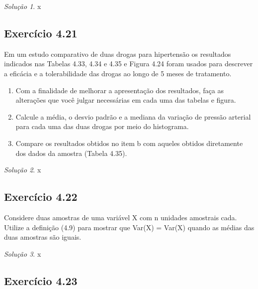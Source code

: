 \documentclass[
]{latex/krantz}
\providecommand{\tightlist}{%
  \setlength{\itemsep}{0pt}\setlength{\parskip}{0pt}}
\theoremstyle{definition}
\theoremstyle{definition}
\theoremstyle{definition}
\theoremstyle{definition}
\theoremstyle{remark}
\newtheorem*{solution}{Solução}
\begin{document}
\begin{solution}
x
\end{solution}

\hypertarget{exr4-21}{%
\subsection*{Exercício 4.21}\label{exr4-21}}

Em um estudo comparativo de duas drogas para hipertensão os resultados indicados nas Tabelas 4.33, 4.34 e 4.35 e Figura 4.24 foram usados para descrever a eficácia e a tolerabilidade das drogas ao longo de 5 meses de tratamento.

\begin{enumerate}
\def\labelenumi{\alph{enumi}.}
\tightlist
\item
  Com a finalidade de melhorar a apresentação dos resultados, faça as alterações que você julgar necessárias em cada uma das tabelas e figura.
\item
  Calcule a média, o desvio padrão e a mediana da variação de pressão arterial para cada uma das duas drogas por meio do histograma.
\item
  Compare os resultados obtidos no item b com aqueles obtidos diretamente dos dados da amostra (Tabela 4.35).
\end{enumerate}

\begin{solution}
x
\end{solution}

\hypertarget{exr4-22}{%
\subsection*{Exercício 4.22}\label{exr4-22}}

Considere duas amostras de uma variável X com n unidades amostrais cada. Utilize a definição (4.9) para mostrar que Var(X) = Var(X) quando as médias das duas amostras são iguais.

\begin{solution}
x
\end{solution}

\hypertarget{exr4-23}{%
\subsection*{Exercício 4.23}\label{exr4-23}}
\end{document}
